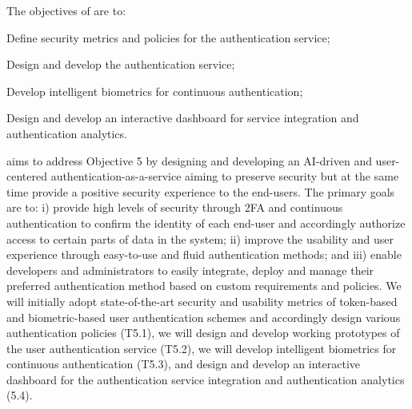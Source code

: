 \addtocounter{wpno}{1}
\begin{Workpackage}{\thewpno}
\WPTitle{\wpname{\thewpno}}


\begin{WPObjectives}
The objectives of \theWP{} are to:
\begin{compactitem}
\item Define security metrics and policies for the authentication service;
\item Design and develop the authentication service;
\item Develop intelligent biometrics for continuous authentication;
\item Design and develop an interactive dashboard for service integration and authentication analytics.
\end{compactitem}
\end{WPObjectives}

\begin{WPDescription}
\theWP{} aims to address Objective 5 by designing and developing an AI-driven and user-centered authentication-as-a-service aiming to preserve security but at the same time provide a positive security experience to the end-users. The primary goals are to: i) provide high levels of security through 2FA and continuous authentication to confirm the identity of each end-user and accordingly authorize access to certain parts of data in the system; ii) improve the usability and user experience through easy-to-use and fluid authentication methods; and iii) enable developers and administrators to easily integrate, deploy and manage their preferred authentication method based on custom requirements and policies. We will initially adopt state-of-the-art security and usability metrics of token-based and biometric-based user authentication schemes and accordingly design various authentication policies (T5.1), we will design and develop working prototypes of the user authentication service (T5.2), we will develop intelligent biometrics for continuous authentication (T5.3), and design and develop an interactive dashboard for the authentication service integration and authentication analytics (5.4).

\end{WPDescription}

\begin{Task}


\end{Task}
\end{Workpackage}
